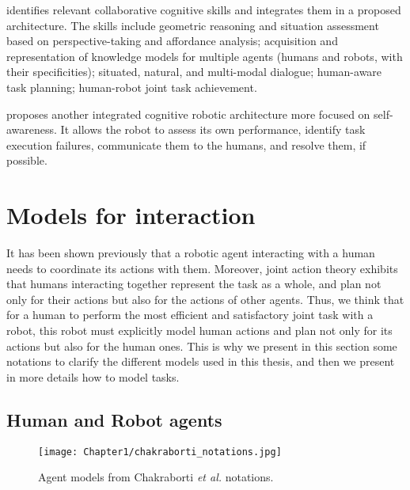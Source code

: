 \cite{lemaignan_artificial_2017} identifies relevant collaborative cognitive skills and integrates them in a proposed architecture. The skills include geometric reasoning and situation assessment based on perspective-taking and affordance analysis; acquisition and representation of knowledge models for multiple agents (humans and robots, with their specificities); situated, natural, and multi-modal dialogue; human-aware task planning; human-robot joint task achievement.

\cite{thierauf_toward_2024} proposes another integrated cognitive robotic architecture more focused on self-awareness. It allows the robot to assess its own performance, identify task execution failures, communicate them to the humans, and resolve them, if possible. 



\section{Models for interaction}


It has been shown previously that a robotic agent interacting with a human needs to coordinate its actions with them. Moreover, joint action theory exhibits that humans interacting together represent the task as a whole, and plan not only for their actions but also for the actions of other agents. Thus, we think that for a human to perform the most efficient and satisfactory joint task with a robot, this robot must explicitly model human actions and plan not only for its actions but also for the human ones. This is why we present in this section some notations to clarify the different models used in this thesis, and then we present in more details how to model tasks.

\subsection{Human and Robot agents}

\begin{figure}
    \centering
    \texttt{[image: Chapter1/chakraborti\_notations.jpg]}
    \caption{Agent models from Chakraborti \textit{et al.} notations.}
    \label{fig:chakraborti_notations}
\end{figure}

